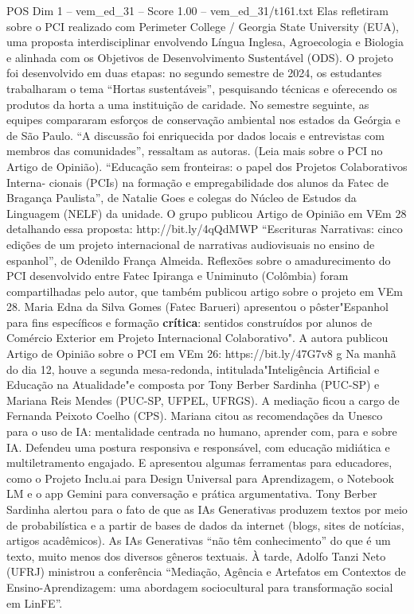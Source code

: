 \begin{textsample}{POS Dim 1 – vem\_ed\_31 – Score 1.00 – vem\_ed\_31/t161.txt}
Elas refletiram sobre o PCI realizado com Perimeter College / Georgia State University (EUA), uma proposta interdisciplinar envolvendo Língua Inglesa, Agroecologia e Biologia e alinhada com os Objetivos de Desenvolvimento Sustentável (ODS).
O projeto foi desenvolvido em duas etapas: no segundo semestre de 2024, os estudantes trabalharam o tema “Hortas sustentáveis”, pesquisando técnicas e oferecendo os produtos da horta a uma instituição de caridade.
No semestre seguinte, as equipes compararam esforços de conservação ambiental nos estados da Geórgia e de São Paulo. “A discussão foi enriquecida por dados locais e entrevistas com membros das comunidades”, ressaltam as autoras. (Leia mais sobre o PCI no Artigo de Opinião). “Educação sem fronteiras: o papel dos Projetos Colaborativos Interna- cionais (PCIs) na formação e empregabilidade dos alunos da Fatec de Bragança Paulista”, de Natalie Goes e colegas do Núcleo de Estudos da Linguagem (NELF) da unidade.
O grupo publicou Artigo de Opinião em VEm 28 detalhando essa proposta: http://bit.ly/4qQdMWP “Escrituras Narrativas: cinco edições de um projeto internacional de narrativas audiovisuais no ensino de espanhol”, de Odenildo França Almeida.
Reflexões sobre o amadurecimento do PCI desenvolvido entre Fatec Ipiranga e Uniminuto (Colômbia) foram compartilhadas pelo autor, que também publicou artigo sobre o projeto em VEm 28.
Maria Edna da Silva Gomes (Fatec Barueri) apresentou o pôster"Espanhol para fins específicos e formação \textbf{crítica}: sentidos construídos por alunos de Comércio Exterior em Projeto Internacional Colaborativo".
A autora publicou Artigo de Opinião sobre o PCI em VEm 26: https://bit.ly/47G7v8 g Na manhã do dia 12, houve a segunda mesa-redonda, intitulada"Inteligência Artificial e Educação na Atualidade"e composta por Tony Berber Sardinha (PUC-SP) e Mariana Reis Mendes (PUC-SP, UFPEL, UFRGS).
A mediação ficou a cargo de Fernanda Peixoto Coelho (CPS).
Mariana citou as recomendações da Unesco para o uso de IA: mentalidade centrada no humano, aprender com, para e sobre IA.
Defendeu uma postura responsiva e responsável, com educação midiática e multiletramento engajado.
E apresentou algumas ferramentas para educadores, como o Projeto Inclu.ai para Design Universal para Aprendizagem, o Notebook LM e o app Gemini para conversação e prática argumentativa.
Tony Berber Sardinha alertou para o fato de que as IAs Generativas produzem textos por meio de probabilística e a partir de bases de dados da internet (blogs, sites de notícias, artigos acadêmicos).
As IAs Generativas “não têm conhecimento” do que é um texto, muito menos dos diversos gêneros textuais. À tarde, Adolfo Tanzi Neto (UFRJ) ministrou a conferência “Mediação, Agência e Artefatos em Contextos de Ensino-Aprendizagem: uma abordagem sociocultural para transformação social em LinFE”.

\end{textsample}
